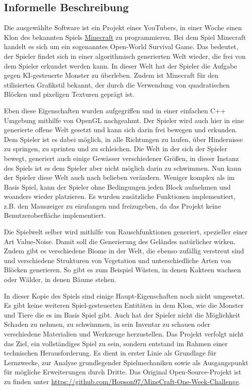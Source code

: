 \documentclass{article}
\begin{document}
\subsection{Informelle Beschreibung} \label{subsec:inf}

Die ausgewählte Software ist ein Projekt eines YouTubers, in einer Woche einen Klon des bekannten Spiels \href{https://www.minecraft.net}{Minecraft} zu programmieren. Bei dem Spiel Minecraft handelt es sich um ein sogenanntes Open-World Survival Game. Das bedeutet, der Spieler findet sich in einer algorithmisch generierten Welt wieder, die frei von dem Spieler erkundet werden kann. In dieser Welt hat der Spieler die Aufgabe gegen KI-gesteuerte Monster zu überleben. Zudem ist Minecraft für den stilisierten Grafikstil bekannt, der durch die Verwendung von quadratischen Blöcken und pixeligen Texturen geprägt ist.

Eben diese Eigenschaften wurden aufgegriffen und in einer einfachen C++ Umgebung mithilfe von OpenGL nachgeahmt. Der Spieler wird auch hier in eine generierte offene Welt gesetzt und kann sich darin frei bewegen und erkunden. Dem Spieler ist es dabei möglich, in alle Richtungen zu laufen, über Hindernisse zu springen, zu sprinten und zu schleichen. Die Welt in der sich der Spieler bewegt, generiert auch einige Gewässer verschiedener Grö\ss{}en, in dieser Instanz des Spiels ist es dem Spieler aber nicht möglich darin zu schwimmen. Nun kann der Spieler diese Welt auch nach belieben verändern. Weniger komplex als im Basis Spiel, kann der Spieler ohne Bedingungen jeden Block aufnehmen und woanders wieder platzieren. Es wurden zusätzliche Funktionen implementiert, z.B. den Mauszeiger zu eizufangen und freizugeben, da das Projekt keine Benutzeroberfläche implementiert.

Die Spielwelt selber wird mithilfe von Rauschfunktionen generiert, spezieller einer Art Value-Noise. Damit soll die Generierung des Geländes natürlicher wirken. Zudem gibt es verschiedene Biome in der Welt, die ebenso zufällig verstreut sind und verschiedene Strukturen von Vegetation und unterschiedliche Arten von Blöcken generieren. So gibt es zum Beispiel Wüsten, in denen Kakteen wachsen oder Wälder, in denen Bäume stehen.

In dieser Kopie des Spiels sind einige Haupt-Eigenschaften noch nicht umgesetzt. Es gibt keine weiteren Spiel-gesteuerten Entitäten in dem Klon, wie die Monster und Tiere die es im Basis Spiel gibt. Auch hat der Spieler nicht die Möglichkeit Schaden zu nehmen, zu schwimmen, in sein Inventar zu schauen oder verschiedene Materialien und Werkzeuge herzustellen. Das Projekt verfolgt nicht das Ziel, ein vollständiges Spiel zu sein, sondern entstand im Rahmen einer technischen Herausforderung. Es dient in erster Linie als Grundlage für Lernzwecke, zur Analyse grundlegender Spielmechaniken sowie als Ausgangspunkt für mögliche Erweiterungen durch Dritte. Das Original Open-Source-Projekt ist zu finden unter \url{https://github.com/Hopson97/MineCraft-One-Week-Challenge}.
\end{document}
